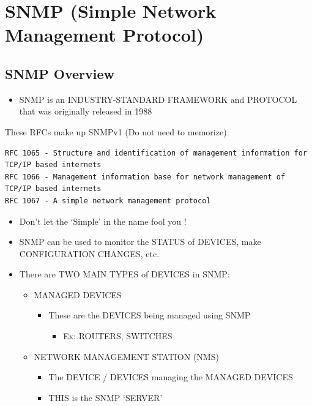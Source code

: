 \chapter{SNMP (Simple Network Management
Protocol)}\label{snmp-simple-network-management-protocol}

\section{SNMP Overview}\label{snmp-overview}

\begin{itemize}
\tightlist
\item
  SNMP is an INDUSTRY-STANDARD FRAMEWORK and PROTOCOL that was
  originally released in 1988
\end{itemize}

These RFCs make up SNMPv1 (Do not need to memorize)

\begin{lstlisting}
RFC 1065 - Structure and identification of management information for TCP/IP based internets
RFC 1066 - Management information base for network management of TCP/IP based internets
RFC 1067 - A simple network management protocol
\end{lstlisting}

\begin{itemize}
\tightlist
\item
  Don't let the `Simple' in the name fool you !
\item
  SNMP can be used to monitor the STATUS of DEVICES, make CONFIGURATION
  CHANGES, etc.
\item
  There are TWO MAIN TYPES of DEVICES in SNMP:

  \begin{itemize}
  \tightlist
  \item
    MANAGED DEVICES

    \begin{itemize}
    \tightlist
    \item
      These are the DEVICES being managed using SNMP

      \begin{itemize}
      \tightlist
      \item
        Ex: ROUTERS, SWITCHES
      \end{itemize}
    \end{itemize}
  \item
    NETWORK MANAGEMENT STATION (NMS)

    \begin{itemize}
    \tightlist
    \item
      The DEVICE / DEVICES managing the MANAGED DEVICES
    \item
      THIS is the SNMP `SERVER'
    \end{itemize}
  \end{itemize}
\end{itemize}

